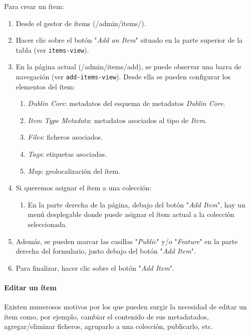 \documentclass[
]{article}
\providecommand{\tightlist}{%
  \setlength{\itemsep}{0pt}\setlength{\parskip}{0pt}}
\begin{document}
Para crear un ítem:

\begin{enumerate}
\def\labelenumi{\arabic{enumi}.}
\tightlist
\item
  Desde el gestor de ítems ({/admin/items/}).
\item
  Hacer clic sobre el botón "\emph{Add an Item}" situado en la parte
  superior de la tabla (ver \texttt{items-view}).
\item
  En la página actual ({/admin/items/add}), se puede observar una barra
  de navegación (ver \texttt{add-items-view}). Desde ella se pueden
  configurar los elementos del ítem:

  \begin{enumerate}
  \def\labelenumii{\alph{enumii}.}
  \tightlist
  \item
    \emph{Dublin Core}: metadatos del esquema de metadatos \emph{Dublin
    Core}.
  \item
    \emph{Item Type Metadata}: metadatos asociados al tipo de
    \emph{Item}.
  \item
    \emph{Files}: ficheros asociados.
  \item
    \emph{Tags}: etiquetas asociadas.
  \item
    \emph{Map}: geolocalización del ítem.
  \end{enumerate}
\item
  Si queremos asignar el ítem a una colección:

  \begin{enumerate}
  \def\labelenumii{\alph{enumii}.}
  \tightlist
  \item
    En la parte derecha de la página, debajo del botón "\emph{Add
    Item}", hay un menú desplegable donde puede asignar el ítem actual a
    la colección seleccionada.
  \end{enumerate}
\item
  Además, se pueden marcar las casillas "\emph{Public}" y/o
  "\emph{Feature}" en la parte derecha del formulario, justo debajo del
  botón "\emph{Add Item}".
\item
  Para finalizar, hacer clic sobre el botón "\emph{Add Item}".
\end{enumerate}

\hypertarget{editar-un-uxedtem}{%
\paragraph{Editar un ítem}\label{editar-un-uxedtem}}

Existen numerosos motivos por los que pueden surgir la necesidad de
editar un ítem como, por ejemplo, cambiar el contenido de sus
metadatados, agregar/eliminar ficheros, agruparlo a una colección,
publicarlo, etc.
\end{document}

